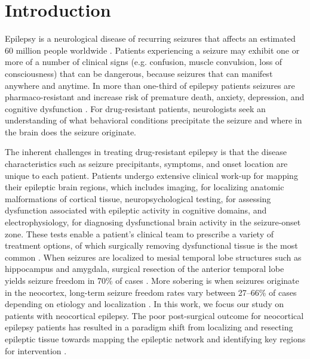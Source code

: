 
\chapter{Introduction}

\ifpdf
    \graphicspath{{introduction/figures/PNG/}{introduction/figures/PDF/}{introduction/figures/}}
\else
    \graphicspath{{introduction/figures/EPS/}{introduction/figures/}}
\fi


Epilepsy is a neurological disease of recurring seizures that affects an estimated 60 million people worldwide \cite{kwan2000early}. Patients experiencing a seizure may exhibit one or more of a number of clinical signs (e.g. confusion, muscle convulsion, loss of consciousness) that can be dangerous, because seizures that can manifest anywhere and anytime. In more than one-third of epilepsy patients seizures are pharmaco-resistant and increase risk of premature death, anxiety, depression, and cognitive dysfunction \cite{kwan2000early, kwan2011drug-resistant}. For drug-resistant patients, neurologists seek an understanding of what behavioral conditions precipitate the seizure and where in the brain does the seizure originate.

The inherent challenges in treating drug-resistant epilepsy is that the disease characteristics such as seizure precipitants, symptoms, and onset location are unique to each patient. Patients undergo extensive clinical work-up for mapping their epileptic brain regions, which includes imaging, for localizing anatomic malformations of cortical tissue, neuropsychological testing, for assessing dysfunction associated with epileptic activity in cognitive domains, and electrophysiology, for diagnosing dysfunctional brain activity in the seizure-onset zone. These tests enable a patient's clinical team to prescribe a variety of treatment options, of which surgically removing dysfunctional tissue is the most common \cite{kwan2011drug-resistant}. When seizures are localized to mesial temporal lobe structures such as hippocampus and amygdala, surgical resection of the anterior temporal lobe yields seizure freedom in 70\% of cases \cite{kwan2011drug-resistant}. More sobering is when seizures originate in the neocortex, long-term seizure freedom rates vary between 27--66\% of cases depending on etiology and localization \cite{tellez-zenteno2005long-term}. In this work, we focus our study on patients with neocortical epilepsy. The poor post-surgical outcome for neocortical epilepsy patients has resulted in a paradigm shift from localizing and resecting epileptic tissue towards mapping the epileptic network and identifying key regions for intervention \cite{spencer2002neural, kramer2012epilepsy, lehnertz2014evolving}.

